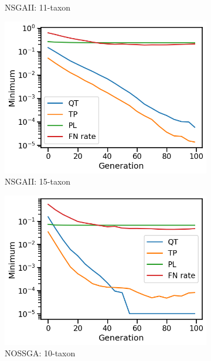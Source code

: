 \begin{figure}[!htbp]
\begin{adjustwidth}{-1cm}{-1cm}
\begin{subfigure}[b]{0.4\textwidth}
			\caption{NSGAII: 11-taxon}
		\end{subfigure}%
		\begin{subfigure}[b]{0.4\textwidth}
			\includegraphics[width=\textwidth]{Figure/15-taxon_NSGAII_minimum}
			\caption{NSGAII: 15-taxon}
		\end{subfigure}
		\begin{subfigure}[b]{0.4\textwidth}
			\includegraphics[width=\textwidth]{Figure/10-taxon_NOSSGA_minimum}
			\caption{NOSSGA: 10-taxon}
		\end{subfigure}%
		\begin{subfigure}[b]{0.4\textwidth}

\end{subfigure}
\end{adjustwidth}
\end{figure}
